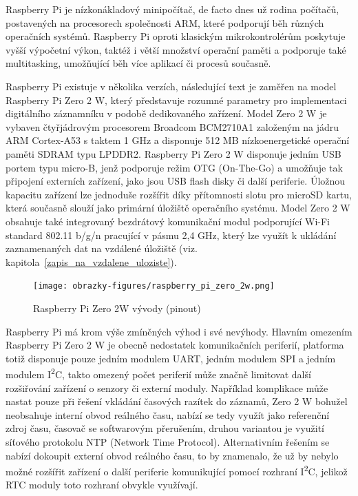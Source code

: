 Raspberry Pi je nízkonákladový minipočítač, de facto dnes už rodina počítačů, postavených na procesorech společnosti ARM, které podporují běh různých operačních systémů. Raspberry Pi oproti klasickým mikrokontrolérům poskytuje vyšší výpočetní výkon, taktéž i větší množství operační paměti a podporuje také multitasking, umožňující běh více aplikací či procesů současně.

Raspberry Pi existuje v několika verzích, následující text je zaměřen na model Raspberry Pi Zero 2 W, který představuje rozumné parametry pro implementaci digitálního záznamníku v podobě dedikovaného zařízení. Model Zero 2 W je vybaven čtyřjádrovým procesorem Broadcom BCM2710A1 založeným na jádru ARM Cortex-A53 s taktem 1 GHz a disponuje 512 MB nízkoenergetické operační paměti SDRAM typu LPDDR2. Raspberry Pi Zero 2 W disponuje jedním USB portem typu micro-B, jenž podporuje režim OTG (On-The-Go) a umožňuje tak připojení externích zařízení, jako jsou USB flash disky či další periferie. Úložnou kapacitu zařízení lze jednoduše rozšířit díky přítomnosti slotu pro microSD kartu, která současně slouží jako primární úložiště operačního systému. Model Zero 2 W obsahuje také integrovaný bezdrátový komunikační modul podporující Wi-Fi standard 802.11 b/g/n pracující v pásmu 2,4 GHz, který lze využít k ukládání zaznamenaných dat na vzdálené úložiště (viz. kapitola~\ref{zapis_na_vzdalene_uloziste}).

\begin{figure}[h]
    \centering
    \texttt{[image: obrazky-figures/raspberry\_pi\_zero\_2w.png]}
    
    \caption{Raspberry Pi Zero 2W vývody (pinout) \cite{arduino_shop_due}}
    \label{fig:raspberry-pi-zero-2w}
\end{figure}

Raspberry Pi má krom výše zmíněných výhod i své nevýhody. Hlavním omezením Raspberry Pi Zero 2 W je obecně nedostatek komunikačních periferií, platforma totiž disponuje pouze jedním modulem UART, jedním modulem SPI a jedním modulem I\textsuperscript{2}C, takto omezený počet periferií může značně limitovat další rozšiřování zařízení o senzory či externí moduly. Například komplikace může nastat pouze při řešení vkládání časových razítek do záznamů, Zero 2 W bohužel neobsahuje interní obvod reálného času, nabízí se tedy využít jako referenční zdroj času, časovač se softwarovým přerušením, druhou variantou je využití síťového protokolu NTP (Network Time Protocol). Alternativním řešením se nabízí dokoupit externí obvod reálného času, to by znamenalo, že už by nebylo možné rozšířit zařízení o další periferie komunikující pomocí rozhraní I\textsuperscript{2}C, jelikož RTC moduly toto rozhraní obvykle využívají.

